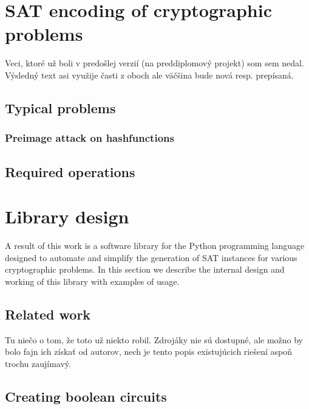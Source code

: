 \chapter{SAT encoding of cryptographic problems}


\begin{framed}
\noindent Veci, ktoré už boli v predošlej verzií (na preddiplomový projekt) som sem nedal. Výsledný text asi využije časti z oboch ale väčšina bude nová resp. prepísaná.
\end{framed}


\section{Typical problems}
\subsection{Preimage attack on hashfunctions}

\section{Required operations}

\chapter{Library design}

A result of this work is a software library for the Python programming language designed to automate and simplify the generation of SAT instances for various cryptographic problems.
In this section we describe the internal design and working of this library with examples of usage.

\section{Related work}

\begin{framed}
\noindent Tu niečo o tom, že toto už niekto robil. Zdrojáky nie sú dostupné, ale možno by bolo fajn ich získať od autorov, nech je tento popis existujúcich riešení aspoň trochu zaujímavý.
\end{framed}

\section{Creating boolean circuits}

